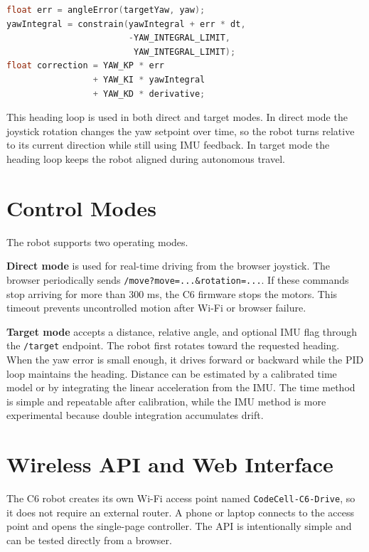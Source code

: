 \documentclass[11pt,a4paper]{article}
\begin{document}
\begin{lstlisting}[language=C++,caption={Core yaw correction idea}]
float err = angleError(targetYaw, yaw);
yawIntegral = constrain(yawIntegral + err * dt,
                        -YAW_INTEGRAL_LIMIT,
                         YAW_INTEGRAL_LIMIT);
float correction = YAW_KP * err
                 + YAW_KI * yawIntegral
                 + YAW_KD * derivative;
\end{lstlisting}

This heading loop is used in both direct and target modes. In direct mode the
joystick rotation changes the yaw setpoint over time, so the robot turns
relative to its current direction while still using IMU feedback. In target
mode the heading loop keeps the robot aligned during autonomous travel.

\section{Control Modes}

The robot supports two operating modes.

\textbf{Direct mode} is used for real-time driving from the browser joystick.
The browser periodically sends \texttt{/move?move=...\&rotation=...}. If these
commands stop arriving for more than 300 ms, the C6 firmware stops the motors.
This timeout prevents uncontrolled motion after Wi-Fi or browser failure.

\textbf{Target mode} accepts a distance, relative angle, and optional IMU flag
through the \texttt{/target} endpoint. The robot first rotates toward the
requested heading. When the yaw error is small enough, it drives forward or
backward while the PID loop maintains the heading. Distance can be estimated by
a calibrated time model or by integrating the linear acceleration from the IMU.
The time method is simple and repeatable after calibration, while the IMU
method is more experimental because double integration accumulates drift.

\section{Wireless API and Web Interface}

The C6 robot creates its own Wi-Fi access point named
\texttt{CodeCell-C6-Drive}, so it does not require an external router. A phone
or laptop connects to the access point and opens the single-page controller.
The API is intentionally simple and can be tested directly from a browser.
\end{document}
